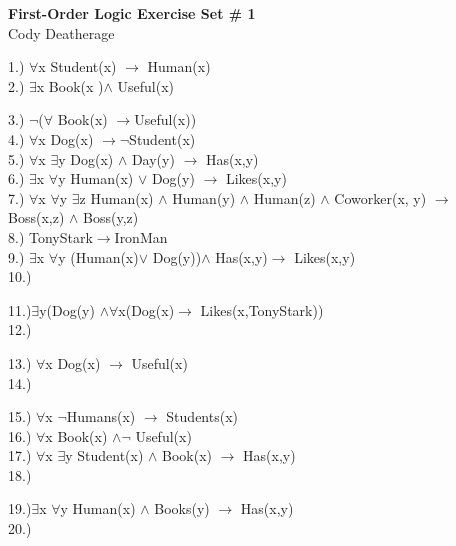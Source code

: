 \documentclass[11pt]{article}
\begin{document}
\begin{flushleft}
\let\ra\rightarrow
\textbf{First-Order Logic Exercise Set \# 1}\\
Cody Deatherage\\
\vspace{0.5cm}

1.)  \(\forall\)x Student(x) \(\ra\) Human(x)\\

2.)  \(\exists\)x Book(x )\(\wedge\) Useful(x)

3.)  \(\lnot\)(\(\forall\) Book(x) \(\ra\)Useful(x))\\

4.)  \(\forall\)x Dog(x) \(\ra\lnot\)Student(x)\\	

5.)  \(\forall\)x \(\exists\)y Dog(x) \(\wedge\) Day(y) \(\ra\) Has(x,y)\\

6.)  \(\exists\)x \(\forall\)y Human(x) \(\vee\) Dog(y) \(\ra\) Likes(x,y)\\

7.)  \(\forall\)x \(\forall\)y \(\exists\)z Human(x) \(\wedge\) Human(y) \(\wedge\) Human(z) \(\wedge\) Coworker(x, y) \(\ra\) Boss(x,z) \(\wedge\) Boss(y,z) \\

8.)  TonyStark\(\ra\)IronMan\\

9.)  \(\exists\)x \(\forall\)y (Human(x)\(\vee\) Dog(y))\(\wedge\) Has(x,y)\(\ra\) Likes(x,y)\\

10.)

11.)\(\exists\)y(Dog(y) \(\wedge\forall\)x(Dog(x)\(\ra\) Likes(x,TonyStark))\\

12.)

13.) \(\forall\)x Dog(x) \(\ra\) Useful(x)\\

14.)

15.) \(\forall\)x \(\lnot\)Humans(x) \(\ra\) Students(x)\\

16.) \(\forall\)x Book(x) \(\wedge\lnot\) Useful(x)\\

17.) \(\forall\)x \(\exists\)y Student(x) \(\wedge\) Book(x) \(\ra\) Has(x,y)\\

18.)

19.)\(\exists\)x \(\forall\)y Human(x) \(\wedge\) Books(y) \(\ra\) Has(x,y)\\

20.)




\end{flushleft}
\end{document}

